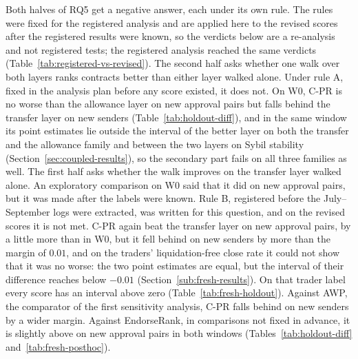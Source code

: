 Both halves of RQ5 get a negative answer, each under its own rule. The rules were fixed for the registered analysis and are applied here to the revised scores after the registered results were known, so the verdicts below are a re-analysis and not registered tests; the registered analysis reached the same verdicts (Table~\ref{tab:registered-vs-revised}). The second half asks whether one walk over both layers ranks contracts better than either layer walked alone. Under rule A, fixed in the analysis plan before any score existed, it does not. On W0, C-PR is no worse than the allowance layer on new approval pairs but falls behind the transfer layer on new senders (Table~\ref{tab:holdout-diff}), and in the same window its point estimates lie outside the interval of the better layer on both the transfer and the allowance family and between the two layers on Sybil stability (Section~\ref{sec:coupled-results}), so the secondary part fails on all three families as well. The first half asks whether the walk improves on the transfer layer walked alone. An exploratory comparison on W0 said that it did on new approval pairs, but it was made after the labels were known. Rule B, registered before the July--September logs were extracted, was written for this question, and on the revised scores it is not met. C-PR again beat the transfer layer on new approval pairs, by a little more than in W0, but it fell behind on new senders by more than the margin of $0.01$, and on the traders' liquidation-free close rate it could not show that it was no worse: the two point estimates are equal, but the interval of their difference reaches below $-0.01$ (Section~\ref{sub:fresh-results}). On that trader label every score has an interval above zero (Table~\ref{tab:fresh-holdout}). Against AWP, the comparator of the first sensitivity analysis, C-PR falls behind on new senders by a wider margin. Against EndorseRank, in comparisons not fixed in advance, it is slightly above on new approval pairs in both windows (Tables~\ref{tab:holdout-diff} and~\ref{tab:fresh-posthoc}).

